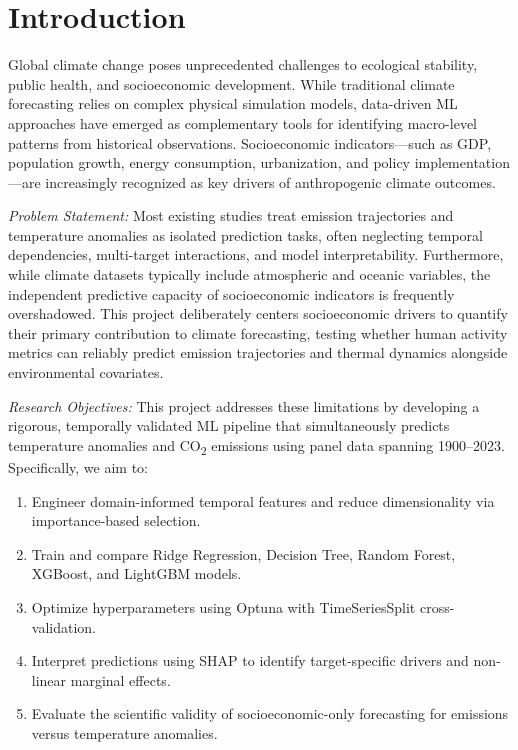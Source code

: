 \documentclass[conference]{IEEEtran}
\begin{document}
\section{Introduction}

Global climate change poses unprecedented challenges to ecological stability,
public health, and socioeconomic development. While traditional climate
forecasting relies on complex physical simulation models, data-driven ML
approaches have emerged as complementary tools for identifying macro-level
patterns from historical observations. Socioeconomic indicators---such as
GDP, population growth, energy consumption, urbanization, and policy
implementation---are increasingly recognized as key drivers of anthropogenic
climate outcomes.

\textit{Problem Statement:} Most existing studies treat emission trajectories
and temperature anomalies as isolated prediction tasks, often neglecting
temporal dependencies, multi-target interactions, and model interpretability.
Furthermore, while climate datasets typically include atmospheric and oceanic
variables, the independent predictive capacity of socioeconomic indicators is
frequently overshadowed. This project deliberately centers socioeconomic
drivers to quantify their primary contribution to climate forecasting, testing
whether human activity metrics can reliably predict emission trajectories and
thermal dynamics alongside environmental covariates.

\textit{Research Objectives:} This project addresses these limitations by
developing a rigorous, temporally validated ML pipeline that simultaneously
predicts temperature anomalies and CO\textsubscript{2} emissions using panel
data spanning 1900--2023. Specifically, we aim to:
\begin{enumerate}
    \item Engineer domain-informed temporal features and reduce dimensionality
    via importance-based selection.
    \item Train and compare Ridge Regression, Decision Tree, Random Forest,
    XGBoost, and LightGBM models.
    \item Optimize hyperparameters using Optuna with TimeSeriesSplit
    cross-validation.
    \item Interpret predictions using SHAP to identify target-specific drivers
    and non-linear marginal effects.
    \item Evaluate the scientific validity of socioeconomic-only forecasting
    for emissions versus temperature anomalies.
\end{enumerate}
\end{document}
